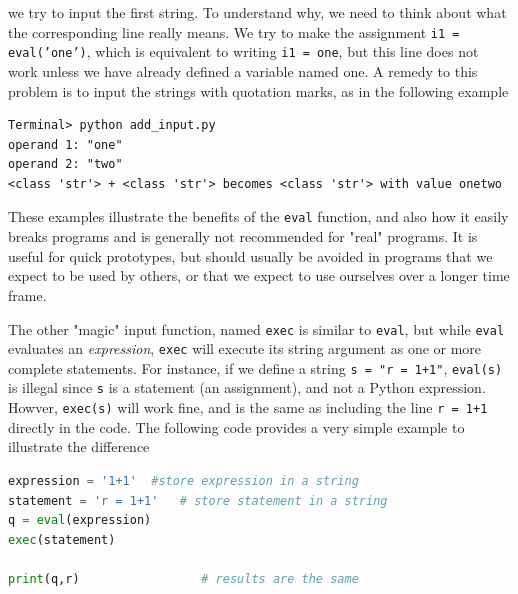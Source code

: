 \documentclass[graybox,envcountchap,sectrefs,final]{svmonodo}
\begin{document}
we try to input the first string. To understand why, we need to think about what the corresponding line really means.
We try to make the assignment \texttt{i1 = eval('one')}, which is equivalent to writing \texttt{i1 = one}, but this line does not work
unless we have already defined a variable named one. A remedy to this problem is to input the strings with quotation marks,
as in the following example
\begin{Verbatim}[frame=lines,label=\fbox{{\tiny Terminal}},framesep=2.5mm,framerule=0.7pt]
Terminal> python add_input.py
operand 1: "one"
operand 2: "two"
<class 'str'> + <class 'str'> becomes <class 'str'> with value onetwo
\end{Verbatim}
These examples illustrate the benefits of the \texttt{eval} function, and also how it easily breaks programs and is generally not
recommended for "real" programs. It is useful for quick prototypes, but should usually
be avoided in programs that we expect to be used by others, or that we expect to use ourselves over a longer time frame.

The other "magic" input function, named \texttt{exec} is similar to \texttt{eval}, but while \texttt{eval} evaluates an \emph{expression}, \texttt{exec} will
execute its string argument as one or more complete statements. For instance, if we define a string \texttt{s = "r = 1+1"},
\texttt{eval(s)} is illegal since \texttt{s} is a statement (an assignment), and not a Python expression. Howver, \texttt{exec(s)} will work
fine, and is the same as including the line \texttt{r = 1+1} directly in the code. The following code provides a very simple example
to illustrate the difference
\begin{lstlisting}[language=Python,style=blue1]
expression = '1+1'	#store expression in a string
statement = 'r = 1+1'   # store statement in a string
q = eval(expression)
exec(statement)

print(q,r)                 # results are the same
\end{lstlisting}
\end{document}
